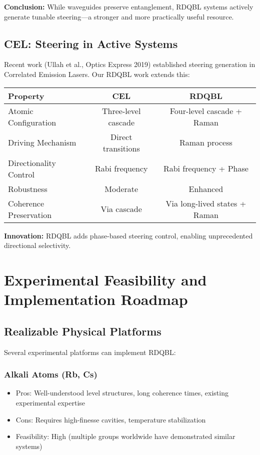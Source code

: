 \textbf{Conclusion:} While waveguides preserve entanglement, RDQBL systems actively generate tunable steering—a stronger and more practically useful resource.

\subsection{CEL: Steering in Active Systems}

Recent work (Ullah et al., Optics Express 2019) established steering generation in Correlated Emission Lasers. Our RDQBL work extends this:

\begin{table}[h]
\centering
\begin{tabular}{lcc}
\textbf{Property} & \textbf{CEL} & \textbf{RDQBL} \\
\hline
Atomic Configuration & Three-level cascade & Four-level cascade + Raman \\
Driving Mechanism & Direct transitions & Raman process \\
Directionality Control & Rabi frequency & Rabi frequency + Phase \\
Robustness & Moderate & Enhanced \\
Coherence Preservation & Via cascade & Via long-lived states + Raman \\
\end{tabular}
\end{table}

\textbf{Innovation:} RDQBL adds phase-based steering control, enabling unprecedented directional selectivity.

\section{Experimental Feasibility and Implementation Roadmap}

\subsection{Realizable Physical Platforms}

Several experimental platforms can implement RDQBL:

\subsubsection{Alkali Atoms (Rb, Cs)}
\begin{itemize}
	\item Pros: Well-understood level structures, long coherence times, existing experimental expertise
	\item Cons: Requires high-finesse cavities, temperature stabilization
	\item Feasibility: High (multiple groups worldwide have demonstrated similar systems)
\end{itemize}

